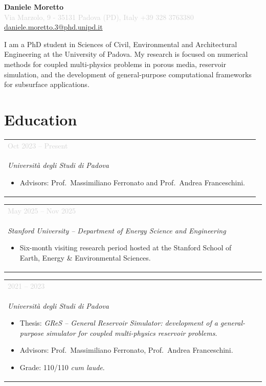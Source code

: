 \documentclass[10pt, a4paper]{article}
\makeatletter
\newcommand{\entry}[4]{%
  \begin{tabular}{@{}p{3.2cm} p{12.0cm}@{}}
    \raggedright\small\textcolor{lightgray}{#1} &
    \begin{minipage}[t]{12.0cm}
      \textbf{#2}\\
      \textit{#3}
      #4
    \end{minipage}
  \end{tabular}%
  \vspace{0.55em}
}
\newenvironment{entrylist}{%
  \begin{itemize}[leftmargin=1em, itemsep=0pt, topsep=2pt, parsep=0pt]
}{%
  \end{itemize}
}
\makeatother
\begin{document}
 
\begin{center}
  {\LARGE\bfseries Daniele Moretto}\\[0.5em]
  \textcolor{lightgray}{
    \faMapMarker*\enspace Via Marzolo, 9 - 35131 Padova (PD), Italy
    \quad
    \faPhone*\enspace +39 328 3763380
  }\\[0.3em]
  \href{mailto:daniele.moretto.3@phd.unipd.it}{%
    \faEnvelope\enspace daniele.moretto.3@phd.unipd.it}
\end{center}
 
\vspace{0.6em}
 
I am a PhD student in Sciences of Civil, Environmental and Architectural Engineering
at the University of Padova. My research is focused on numerical methods for coupled
multi-physics problems in porous media, reservoir simulation, and the development of
general-purpose computational frameworks for subsurface applications.
 
\section{Education}
 
\entry{Oct 2023 – Present}
  {PhD in Sciences of Civil, Environmental and Architectural Engineering}
  {Università degli Studi di Padova}
  {%
    \begin{entrylist}
      \item Advisors: Prof.\ Massimiliano Ferronato and Prof.\ Andrea Franceschini.
    \end{entrylist}
  }

\entry{May 2025 – Nov 2025}
  {Visiting Student Researcher}
  {Stanford University – Department of Energy Science and Engineering}
  {%
    \begin{entrylist}
      \item Six-month visiting research period hosted at the Stanford School of Earth, Energy \& Environmental Sciences.
    \end{entrylist}
  }
 
\entry{2021 – 2023}
  {Master's Degree in Civil Engineering}
  {Università degli Studi di Padova}
  {%
    \begin{entrylist}
      \item Thesis: \textit{GReS – General Reservoir Simulator: development of a
        general-purpose simulator for coupled multi-physics reservoir problems}.
      \item Advisors: Prof.\ Massimiliano Ferronato, Prof.\ Andrea Franceschini.
      \item Grade: 110/110 \textit{cum laude}.
    \end{entrylist}
  }
 
\end{document}
